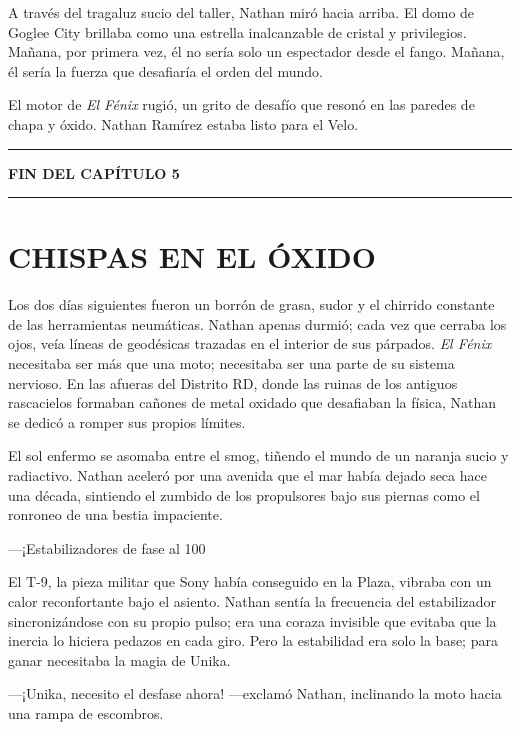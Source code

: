 \documentclass[12pt,a4paper]{book}
\begin{document}
A través del tragaluz sucio del taller, Nathan miró hacia arriba. El domo de Goglee City brillaba como una estrella inalcanzable de cristal y privilegios. Mañana, por primera vez, él no sería solo un espectador desde el fango. Mañana, él sería la fuerza que desafiaría el orden del mundo.

El motor de \textit{El Fénix} rugió, un grito de desafío que resonó en las paredes de chapa y óxido. Nathan Ramírez estaba listo para el Velo.

\bigskip
\noindent\rule{\textwidth}{0.4pt}
\bigskip

\textbf{FIN DEL CAPÍTULO 5}


\bigskip
\noindent\rule{\textwidth}{0.4pt}
\bigskip

\chapter{CHISPAS EN EL ÓXIDO}

Los dos días siguientes fueron un borrón de grasa, sudor y el chirrido constante de las herramientas neumáticas. Nathan apenas durmió; cada vez que cerraba los ojos, veía líneas de geodésicas trazadas en el interior de sus párpados. \textit{El Fénix} necesitaba ser más que una moto; necesitaba ser una parte de su sistema nervioso. En las afueras del Distrito RD, donde las ruinas de los antiguos rascacielos formaban cañones de metal oxidado que desafiaban la física, Nathan se dedicó a romper sus propios límites.

El sol enfermo se asomaba entre el smog, tiñendo el mundo de un naranja sucio y radiactivo. Nathan aceleró por una avenida que el mar había dejado seca hace una década, sintiendo el zumbido de los propulsores bajo sus piernas como el ronroneo de una bestia impaciente.

---¡Estabilizadores de fase al 100%

El T-9, la pieza militar que Sony había conseguido en la Plaza, vibraba con un calor reconfortante bajo el asiento. Nathan sentía la frecuencia del estabilizador sincronizándose con su propio pulso; era una coraza invisible que evitaba que la inercia lo hiciera pedazos en cada giro. Pero la estabilidad era solo la base; para ganar necesitaba la magia de Unika.

---¡Unika, necesito el desfase ahora! ---exclamó Nathan, inclinando la moto hacia una rampa de escombros.
\end{document}
